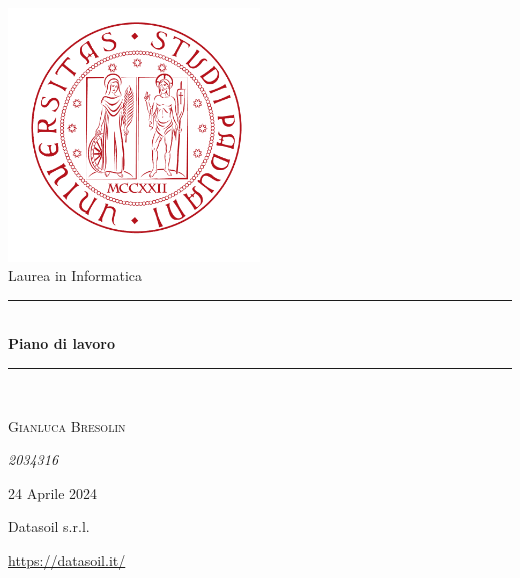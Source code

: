 \documentclass[a4paper, 12pt]{article}
\begin{document}
\begin{titlepage}
    \begin{center}
        \includegraphics[width=0.5\textwidth]{unipd.png}\\

        {\large Laurea in Informatica}\\[0.5cm]

        \rule{\linewidth}{0.5mm} \\[0.4cm]
        { \huge \bfseries Piano di lavoro \\[0.4cm] } %

        \rule{\linewidth}{0.5mm} \\[1.cm]
        \noindent

        {\Large \textsc{Gianluca Bresolin} \\[0.2cm] \par}
        {\large \textit{2034316} \\[2cm] \par}

        {\large 24 Aprile 2024\\[1.5cm] \par}

        {\large Datasoil s.r.l. \\[1.5cm] \par}

        \vfill
        {\large \href{https://datasoil.it/}{https://datasoil.it/}} %
    \end{center}
\end{titlepage}

\clearpage %

\tableofcontents
\clearpage

\pagestyle{fancy}
\end{document}
